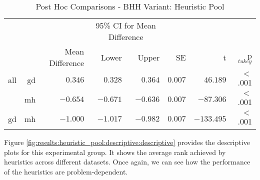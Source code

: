 \begin{table}[htbp]
	\centering
	\caption{Post Hoc Comparisons - BHH Variant: Heuristic Pool}
	\label{tab:results:heuristic_pool:post_hoc}%
	\par\bigskip
	\resizebox{\textwidth}{!}
	{
		\begin{tabular}{lrrrrrrr}
			\toprule
			\multicolumn{1}{c}{} & \multicolumn{1}{c}{} & \multicolumn{1}{c}{} & \multicolumn{2}{c}{95\% CI for Mean Difference} & \multicolumn{1}{c}{} & \multicolumn{1}{c}{} & \multicolumn{1}{c}{}               \\
			\cline{4-5}
			$ $                  & $ $                  & Mean Difference      & Lower                                           & Upper                & SE                   & t                    & p$_{tukey}$ \\
			\cmidrule[0.4pt]{1-8}
			all                  & gd                   & $0.346$              & $0.328$                                         & $0.364$              & $0.007$              & $46.189$             & $<$ .001    \\
			$ $                  & mh                   & $-0.654$             & $-0.671$                                        & $-0.636$             & $0.007$              & $-87.306$            & $<$ .001    \\
			gd                   & mh                   & $-1.000$             & $-1.017$                                        & $-0.982$             & $0.007$              & $-133.495$           & $<$ .001    \\
			\bottomrule
		\end{tabular}
	}
\end{table}

Figure \ref{fig:results:heuristic_pool:descriptive:descriptive} provides the descriptive plots for this experimental group. It shows the average rank achieved by heuristics across different datasets. Once again, we can see how the performance of the heuristics are problem-dependent.

